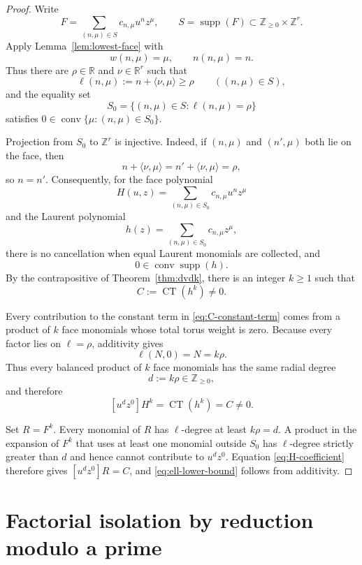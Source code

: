 \documentclass[11pt]{article}
\numberwithin{equation}{section}
\theoremstyle{definition}
\theoremstyle{remark}
\newcommand{\R}{\mathbb R}
\newcommand{\Z}{\mathbb Z}
\newcommand{\supp}{\operatorname{supp}}
\newcommand{\conv}{\operatorname{conv}}
\newcommand{\CT}{\operatorname{CT}}
\begin{document}
\begin{proof}
Write
\[
  F=\sum_{(n,\mu)\in S}c_{n,\mu}u^nz^\mu,
  \qquad
  S=\supp(F)\subset\Z_{\ge0}\times\Z^r.
\]
Apply Lemma~\ref{lem:lowest-face} with
\[
  w(n,\mu)=\mu,
  \qquad
  n(n,\mu)=n.
\]
Thus there are $\rho\in\R$ and $\nu\in\R^r$ such that
\begin{equation}\label{eq:ell-def}
  \ell(n,\mu):=n+\langle\nu,\mu\rangle\ge\rho
  \qquad((n,\mu)\in S),
\end{equation}
and the equality set
\[
  S_0=\{(n,\mu)\in S:\ell(n,\mu)=\rho\}
\]
satisfies $0\in\conv\{\mu:(n,\mu)\in S_0\}$.

Projection from $S_0$ to $\Z^r$ is injective.  Indeed, if $(n,\mu)$ and
$(n',\mu)$ both lie on the face, then
\[
  n+\langle\nu,\mu\rangle
  =n'+\langle\nu,\mu\rangle=\rho,
\]
so $n=n'$.  Consequently, for the face polynomial
\[
  H(u,z)=\sum_{(n,\mu)\in S_0}c_{n,\mu}u^nz^\mu
\]
and the Laurent polynomial
\begin{equation}\label{eq:face-laurent}
  h(z)=\sum_{(n,\mu)\in S_0}c_{n,\mu}z^\mu,
\end{equation}
there is no cancellation when equal Laurent monomials are collected, and
\[
  0\in\conv\supp(h).
\]
By the contrapositive of Theorem~\ref{thm:dvdk}, there is an integer $k\ge1$
such that
\begin{equation}\label{eq:C-constant-term}
  C:=\CT(h^k)\ne0.
\end{equation}

Every contribution to the constant term in \eqref{eq:C-constant-term}
comes from a product of $k$ face monomials whose total torus weight is zero.
Because every factor lies on $\ell=\rho$, additivity gives
\[
  \ell(N,0)=N=k\rho.
\]
Thus every balanced product of $k$ face monomials has the same radial degree
\[
  d:=k\rho\in\Z_{\ge0},
\]
and therefore
\begin{equation}\label{eq:H-coefficient}
  [u^dz^0]H^k=\CT(h^k)=C\ne0.
\end{equation}

Set $R=F^k$.  Every monomial of $R$ has $\ell$-degree at least $k\rho=d$.
A product in the expansion of $F^k$ that uses at least one monomial outside
$S_0$ has $\ell$-degree strictly greater than $d$ and hence cannot
contribute to $u^dz^0$.  Equation \eqref{eq:H-coefficient} therefore gives
$[u^dz^0]R=C$, and \eqref{eq:ell-lower-bound} follows from additivity.
\end{proof}

\section{Factorial isolation by reduction modulo a prime}
\end{document}

